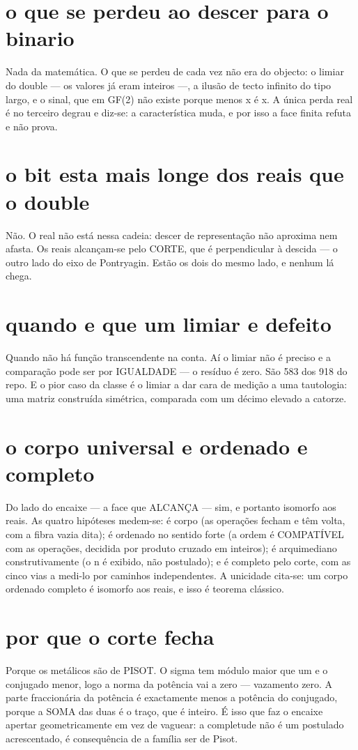 \documentclass[11pt,a4paper]{article}
\begin{document}
\section{o que se perdeu ao descer para o binario}
Nada da matemática. O que se perdeu de cada vez não era do objecto: o limiar do double —
os valores já eram inteiros —, a ilusão de tecto infinito do tipo largo, e o sinal, que em
GF(2) não existe porque menos x é x. A única perda real é no terceiro degrau e diz-se: a
característica muda, e por isso a face finita refuta e não prova.

\section{o bit esta mais longe dos reais que o double}
Não. O real não está nessa cadeia: descer de representação não aproxima nem afasta. Os
reais alcançam-se pelo CORTE, que é perpendicular à descida — o outro lado do eixo de
Pontryagin. Estão os dois do mesmo lado, e nenhum lá chega.

\section{quando e que um limiar e defeito}
Quando não há função transcendente na conta. Aí o limiar não é preciso e a comparação pode
ser por IGUALDADE — o resíduo é zero. São 583 dos 918 do repo. E o pior caso da classe é o
limiar a dar cara de medição a uma tautologia: uma matriz construída simétrica, comparada
com um décimo elevado a catorze.

\section{o corpo universal e ordenado e completo}
Do lado do encaixe — a face que ALCANÇA — sim, e portanto isomorfo aos reais. As quatro
hipóteses medem-se: é corpo (as operações fecham e têm volta, com a fibra vazia dita); é
ordenado no sentido forte (a ordem é COMPATÍVEL com as operações, decidida por produto
cruzado em inteiros); é arquimediano construtivamente (o n é exibido, não postulado); e é
completo pelo corte, com as cinco vias a medi-lo por caminhos independentes. A unicidade
cita-se: um corpo ordenado completo é isomorfo aos reais, e isso é teorema clássico.

\section{por que o corte fecha}
Porque os metálicos são de PISOT. O sigma tem módulo maior que um e o conjugado menor, logo
a norma da potência vai a zero — vazamento zero. A parte fraccionária da potência é
exactamente menos a potência do conjugado, porque a SOMA das duas é o traço, que é inteiro.
É isso que faz o encaixe apertar geometricamente em vez de vaguear: a completude não é um
postulado acrescentado, é consequência de a família ser de Pisot.
\end{document}
